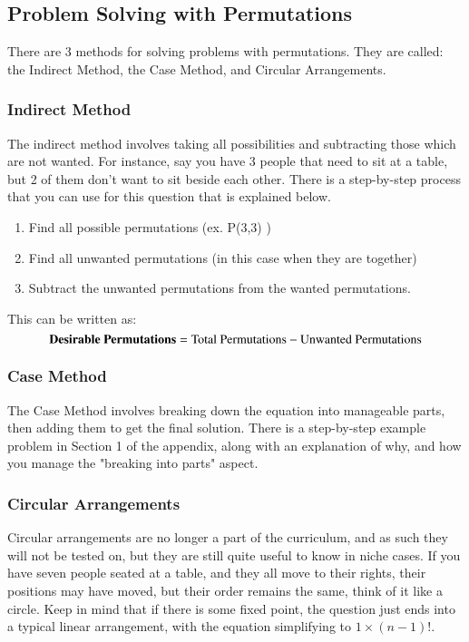 \documentclass[final,1p,12pt]{elsarticle}
\begin{document}
    \subsection{Problem Solving with Permutations}
    There are 3 methods for solving problems with permutations. They are called: the Indirect Method, the Case Method, and Circular Arrangements.
    
        \subsubsection{Indirect Method}
        The indirect method involves taking all possibilities and subtracting those which are not wanted. For instance, say you have 3 people that need to sit at a table, but 2 of them don't want to sit beside each other. There is a step-by-step process that you can use for this question that is explained below.
        \begin{enumerate}
                \item Find all possible permutations (ex. P(3,3) )
                \item Find all unwanted permutations (in this case when they are together)
                \item Subtract the unwanted permutations from the wanted permutations.
            \end{enumerate}
        This can be written as: \[\mbox{\textbf{Desirable Permutations}} = \mbox{Total Permutations} - \mbox{Unwanted Permutations}\]
    
        \subsubsection{Case Method}
        The Case Method involves breaking down the equation into manageable parts, then adding them to get the final solution. There is a step-by-step example problem in Section 1 of the appendix, along with an explanation of why, and how you manage the "breaking into parts" aspect.

        \clearpage
    
        \subsubsection{Circular Arrangements}
        Circular arrangements are no longer a part of the curriculum, and as such they will not be tested on, but they are still quite useful to know in niche cases. If you have seven people seated at a table, and they all move to their rights, their positions may have moved, but their order remains the same, think of it like a circle. Keep in mind that if there is some fixed point, the question just ends into a typical linear arrangement, with the equation simplifying to $1 \times (n-1)!$.
        
\end{document}
